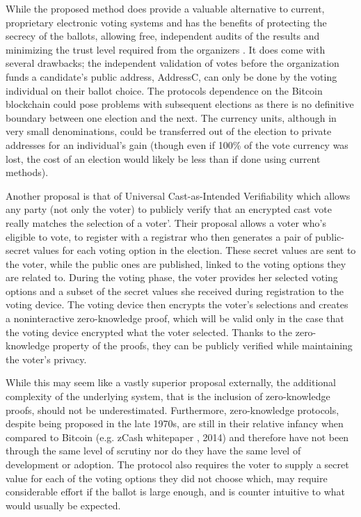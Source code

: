 \documentclass{article}
\begin{document}
While the proposed method does provide a valuable alternative to current, proprietary electronic voting systems and has the benefits of protecting the secrecy of the ballots, allowing free, independent audits of the results and minimizing the trust level required from the organizers \citep{3_noizat_2016}. It does come with several drawbacks; the independent validation of votes before the organization funds a candidate's public address, AddressC, can only be done by the voting individual on their ballot choice. The protocols dependence on the Bitcoin blockchain could pose problems with subsequent elections as there is no definitive boundary between one election and the next. The currency units, although in very small denominations, could be transferred out of the election to private addresses for an individual's gain (though even if 100\% of the vote currency was lost, the cost of an election would likely be less than if done using current methods).

Another proposal is that of Universal Cast-as-Intended Verifiability \citep{49_escala_guasch_herranz_morillo_2015} which allows any party (not only the voter) to publicly verify that an encrypted cast vote really matches the selection of a voter’. Their proposal allows a voter who’s eligible to vote, to register with a registrar who then generates a pair of public-secret values for each voting option in the election. These secret values are sent to the voter, while the public ones are published, linked to the voting options they are related to. During the voting phase, the voter provides her selected voting options and a subset of the secret values she received during registration to the voting device. The voting device then encrypts the voter’s selections and creates a noninteractive zero-knowledge proof, which will be valid only in the case that the voting device encrypted what the voter selected. Thanks to the zero-knowledge property of the proofs, they can be publicly verified while maintaining the voter’s privacy.

While this may seem like a vastly superior proposal externally, the additional complexity of the underlying system, that is the inclusion of zero-knowledge proofs, should not be underestimated. Furthermore, zero-knowledge protocols, despite being proposed in the late 1970s, are still in their relative infancy when compared to Bitcoin (e.g. zCash whitepaper \citep{50_ben-sasson_chiesa_garman_green_miers_tromer_virza_2014}, 2014) and therefore have not been through the same level of scrutiny nor do they have the same level of development or adoption. The protocol also requires the voter to supply a secret value for each of the voting options they did not choose which, may require considerable effort if the ballot is large enough, and is counter intuitive to what would usually be expected.

\printbibliography
\end{document}

